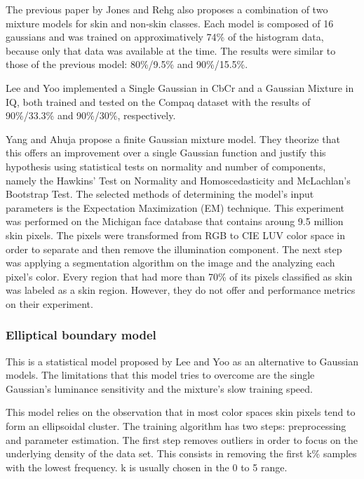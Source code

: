 \documentclass[12pt]{report}
\begin{document}
	The previous paper\cite{compaq} by Jones and Rehg also proposes a combination of two mixture models for skin and non-skin classes. Each model is composed of 16 gaussians and was trained on approximatively 74\% of the histogram data, because only that data was available at the time. The results were similar to those of the previous model: 80\%/9.5\% and 90\%/15.5\%.
	
	Lee and Yoo\cite{gaussian_applied} implemented a Single Gaussian in CbCr and a Gaussian Mixture in IQ, both trained and tested on the Compaq dataset with the results of 90\%/33.3\% and 90\%/30\%, respectively.
	
	Yang and Ahuja\cite{Yang99gaussianmixture} propose a finite Gaussian mixture model. They theorize that this offers an improvement over a single Gaussian function and justify this hypothesis using statistical tests on normality and number of components, namely the Hawkins' Test on Normality and Homoscedasticity and McLachlan's Bootstrap Test. The selected methods of determining the model's input parameters is the Expectation Maximization (EM) technique. This experiment was performed on the Michigan face database that contains aroung 9.5 million skin pixels. The pixels were transformed from RGB to CIE LUV color space in order to separate and then remove the illumination component. The next step was applying a segmentation algorithm on the image and the analyzing each pixel's color. Every region that had more than 70\% of its pixels classified as skin was labeled as a skin region. However, they do not offer and performance metrics on their experiment.
	
	\subsubsection{Elliptical boundary model}
	This is a statistical model proposed by Lee and Yoo\cite{gaussian_applied} as an alternative to Gaussian models. The limitations that this model tries to overcome are the single Gaussian's luminance sensitivity and the mixture's slow training speed.
	
	This model relies on the observation\cite{Yang99gaussianmixture} that in most color spaces skin pixels tend to form an ellipsoidal cluster. The training algorithm has two steps: preprocessing and parameter estimation. The first step removes outliers in order to focus on the underlying density of the data set. This consists in removing the first k\% samples with the lowest frequency. k is usually chosen in the 0 to 5 range.
	
\end{document}
